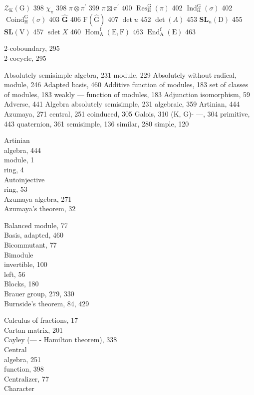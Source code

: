 \(\mathcal{Z}_{\mathrm{K}}(\mathrm{G})\) 398 \(\chi_{\pi}\) 398 \(\pi \otimes \pi^{\prime}\) 399 \(\pi \boxtimes \pi^{\prime}\) 400 \(\operatorname{Res}_{\mathrm{H}}^{\mathrm{G}}(\pi)\) 402 \(\operatorname{Ind}_{\mathrm{H}}^{\mathrm{G}}(\sigma)\) 402 \(\operatorname{Coind}_{\mathrm{H}}^{\mathrm{G}}(\sigma)\) 403 \(\widehat{\mathbf{G}}\) 406 \(\mathrm{F}(\widehat{\mathrm{G}})\) 407 \(\det u\) 452 \(\det(A)\) 453 \(\mathbf{SL}_n(\mathrm{D})\) 455 \(\mathbf{SL}(\mathrm{V})\) 457 \(\operatorname{sdet} X\) 460 \(\operatorname{Hom}_{\mathrm{A}}^{\mathrm{f}}(\mathrm{E},\mathrm{F})\) 463 \(\operatorname{End}_{\mathrm{A}}^{\mathrm{f}}(\mathrm{E})\) 463


2-coboundary, 295\\
2-cocycle, 295


Absolutely semisimple algebra, 231 module, 229 Absolutely without radical, module, 246 Adapted basis, 460 Additive function of modules, 183 set of classes of modules, 183 weakly --- function of modules, 183 Adjunction isomorphism, 59 Adverse, 441 Algebra absolutely semisimple, 231 algebraic, 359 Artinian, 444 Azumaya, 271 central, 251 coinduced, 305 Galois, 310 (K, G)- ---, 304 primitive, 443 quaternion, 361 semisimple, 136 similar, 280 simple, 120

Artinian\\
algebra, 444\\
module, 1\\
ring, 4\\
Autoinjective\\
ring, 53\\
Azumaya algebra, 271\\
Azumaya's theorem, 32


Balanced module, 77\\
Basis, adapted, 460\\
Bicommutant, 77\\
Bimodule\\
invertible, 100\\
left, 56\\
Blocks, 180\\
Brauer group, 279, 330\\
Burnside's theorem, 84, 429


Calculus of fractions, 17\\
Cartan matrix, 201\\
Cayley (--- - Hamilton theorem), 338\\
Central\\
algebra, 251\\
function, 398\\
Centralizer, 77\\
Character

